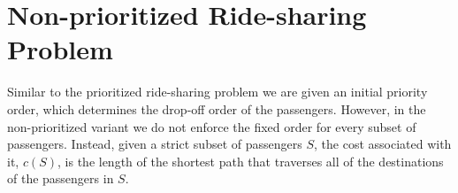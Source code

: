 \documentclass[sigconf]{aamas}
\begin{document}
%

\section{Non-prioritized Ride-sharing Problem}
Similar to the prioritized ride-sharing problem we are given an initial priority order, which determines the drop-off order of the passengers. However, in the non-prioritized variant we do not enforce the fixed order for every subset of passengers. Instead, given a strict subset of passengers $S$, the cost associated with it, $c(S)$, is the length of the shortest path that traverses all of the destinations of the passengers in $S$. 
\end{document}

